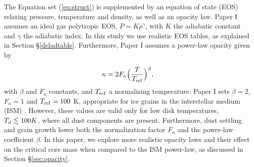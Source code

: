 \documentclass[apj]{emulateapj}
\newcommand{\di}{_{\rm d}}
\begin{document}
The Equation set (\ref{eq:struct}) is supplemented by an equation of state (EOS) relating pressure, temperature and density, as well as an opacity law. Paper I assumes an ideal gas polytropic EOS, $P=K\rho^{\gamma}$, with $K$ the adiabatic constant and $\gamma$ the adiabatic index. In this study we use realistic EOS tables, as explained in Section \S\ref{deladtable}. Furthermore, Paper I assumes a power-law opacity given by

\begin{equation}
\label{eq:opacitylaw}
\kappa=2 F_{\kappa} \Big(\frac{T}{T_{\rm ref}}\Big)^{\beta},
\end{equation}  
\noindent with $\beta$ and $F_{\kappa}$ constants, and $T_{\rm{ref}}$ a normalizing temperature. Paper I sets $\beta=2$, $F_{\kappa}=1$ and $T_{\rm ref}=100$ K, appropriate for ice grains in the interstellar medium (ISM) \citep{bell94}. However, these values are valid only for low disk temperatures, $T\di \lesssim 100 K$, where all dust components are present. Furthermore, dust settling and grain growth lower both the normalization factor $F_{\kappa}$ and the power-law coefficient $\beta$. In this paper, we explore more realistic opacity laws and their effect on the critical core mass when compared to the ISM power-law, as discussed in Section \S\ref{sec:opacity}.



\end{document}

